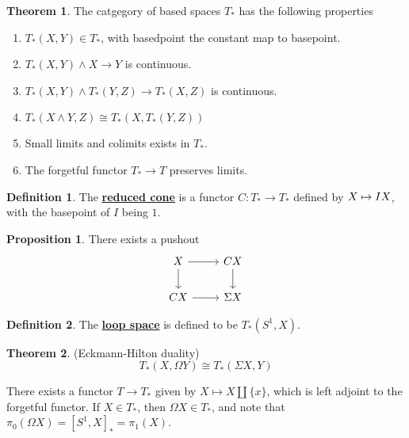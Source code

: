 \documentclass{article}
\theoremstyle{definition}
\newtheorem{theorem}{Theorem}[section]
\theoremstyle{definition}
\newtheorem{definition}{Definition}[theorem]
\theoremstyle{definition}
\theoremstyle{definition}
\newtheorem{proposition}{Proposition}[theorem]
\theoremstyle{definition}
\theoremstyle{definition}
\theoremstyle{definition}
\begin{document}
\begin{tcolorbox}[colback=red!5!white,colframe=red!30!white]
\begin{theorem}
The catgegory of based spaces $T_*$ has the following properties 
\begin{enumerate}
    \item $T_*(X,Y)\in T_*$, with basedpoint the constant map to basepoint.
    \item $T_*(X,Y)\wedge X\to Y$ is continuous.
    \item $T_*(X,Y)\wedge T_*(Y,Z)\to T_*(X,Z)$ is continuous.
    \item $T_*(X\wedge Y,Z)\cong T_*(X,T_*(Y,Z))$
    \item Small limits and colimits exists in $T_*$.
    \item The forgetful functor $T_*\to T$ preserves limits. 
\end{enumerate}
\end{theorem}
\end{tcolorbox}



\begin{tcolorbox}[colback=purple!5!white,colframe=purple!75!black]
\begin{definition}
The \underline{\textbf{reduced cone}} is a functor $C: T_*\to T_*$
defined by $X\mapsto I\smash X$, with the basepoint of $I$ being $1$. 
\end{definition}
\end{tcolorbox}


\begin{tcolorbox}[colback=blue!5!white,colframe=blue!30!white]
\begin{proposition}
There exists a pushout 
\[\begin{tikzcd}
X\arrow[r]\arrow[d]&CX\arrow[d]\\
CX\arrow[r]&\Sigma X
\end{tikzcd}\]
\end{proposition}
\end{tcolorbox}


\begin{tcolorbox}[colback=purple!5!white,colframe=purple!75!black]
\begin{definition}
The \underline{\textbf{loop space}} is defined to be $T_*(S^1,X)$.
\end{definition}
\end{tcolorbox}


\begin{tcolorbox}[colback=red!5!white,colframe=red!30!white]
\begin{theorem}
(Eckmann-Hilton duality) 
\[T_*(X,\Omega Y)\cong T_*(\Sigma X,Y)\] 
\end{theorem}
\end{tcolorbox}

There exists a functor $T\to T_*$ given by $X\mapsto X\coprod \{x\}$, which is left adjoint to the forgetful functor. If $X\in T_*$, then $\Omega X\in T_*$, and note that $\pi_0(\Omega X)=[S^1,X]_*=\pi_1(X)$. 
\end{document}
